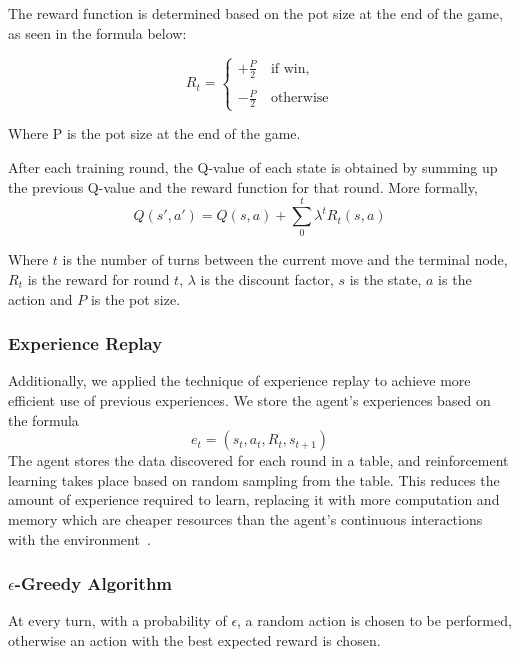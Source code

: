 \documentclass{article}
\begin{document}
The reward function is determined based on the pot size at the end of the game, as seen in the formula below:

\begin{displaymath}
  R_t=
  \left\lbrace
  \begin{array}{l}
    +\frac{P}{2}\quad\text{if win,} \\
    \\
    -\frac{P}{2}\quad\text{otherwise}
  \end{array}
  \right.
\end{displaymath}


\noindent Where P is the pot size at the end of the game.

After each training round, the Q-value of each state  is obtained by summing up the previous Q-value and the reward function for that round. More formally,
\begin{displaymath}
Q\left(s',a'\right)=Q\left(s,a\right)+\sum_{0}^{t}\lambda^{t}R_t\left(s,a\right)
\end{displaymath}

\noindent Where $t$ is the number of turns between the current move and the terminal node, $R_t$ is the reward for round $t$, $\lambda$ is the discount factor, $s$ is the state, $a$ is the action and $P$ is the pot size.

\subsubsection{Experience Replay}
Additionally, we applied the technique of experience replay to achieve more efficient use of previous experiences. We store the agent's experiences based on the formula
\begin{displaymath}
e_t=\left(s_t,a_t,R_t,s_{t+1}\right)
\end{displaymath}
The agent stores the data discovered for each round in a table, and reinforcement learning takes place based on random sampling from the table. This reduces the amount of experience required to learn, replacing it with more computation and memory which are cheaper resources than the agent's continuous interactions with the environment~\cite{sqas:replay}.

\subsubsection{$\epsilon$-Greedy Algorithm}

At every turn, with a probability of $\epsilon$, a random action is chosen to be performed, otherwise an action with the best expected reward is chosen.
\end{document}
